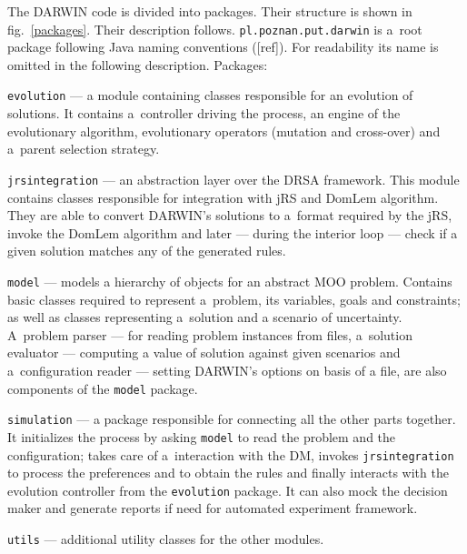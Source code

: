 The DARWIN code is divided into packages. Their structure is shown in
fig.~\ref{packages}. Their description follows. \texttt{pl.poznan.put.darwin}
is a~root package following Java naming conventions ([ref]). For readability
its name is omitted in the following description. Packages:
\begin{description}
  \item{\texttt{evolution}} --- a module containing classes responsible for an
    evolution of solutions. It contains a~controller driving the process, an
    engine of the evolutionary algorithm, evolutionary operators (mutation and
    cross-over) and a~parent selection strategy.

  \item{\texttt{jrsintegration}} --- an abstraction layer over the DRSA
    framework. This module contains classes responsible for integration with
    jRS and DomLem algorithm. They are able to convert DARWIN's solutions to
    a~format required by the jRS, invoke the DomLem algorithm and later ---
    during the interior loop --- check if a given solution matches any of the
    generated rules.

  \item{\texttt{model}} --- models a hierarchy of objects for an abstract MOO
    problem. Contains basic classes required to represent a~problem, its
    variables, goals and constraints; as well as classes representing
    a~solution and a scenario of uncertainty. A~problem parser --- for reading
    problem instances from files, a~solution evaluator --- computing a value
    of solution against given scenarios and a~configuration reader --- setting
    DARWIN's options on basis of a file, are also components of the
    \texttt{model} package.
  \item{\texttt{simulation}} --- a package responsible for connecting all the
    other parts together. It initializes the process by asking \texttt{model}
    to read the problem and the configuration; takes care of a~interaction
    with the DM, invokes \texttt{jrsintegration} to process the preferences
    and to obtain the rules and finally interacts with the evolution
    controller from the \texttt{evolution} package. It can also mock the
    decision maker and generate reports if need for automated experiment
    framework.

  \item{\texttt{utils}} --- additional utility classes for the other modules.
\end{description}

